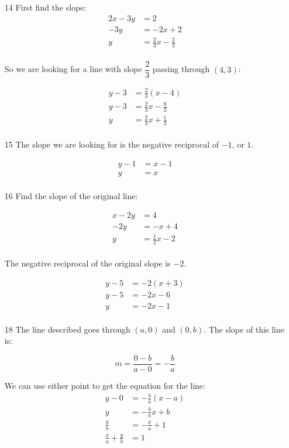 \documentclass[fleqn,addpoints]{exam}
\begin{document}
\begin{itemize}
\item[14]
First find the slope:
\begin{align*}
  2x - 3y &= 2 \\
  -3y &= -2x + 2 \\
  y &= \frac{2}{3}x - \frac{2}{3} \\
\end{align*}

So we are looking for a line with slope $\dfrac{2}{3}$ passing through $(4, 3)$:

\begin{align*}
  y - 3 &= \frac{2}{3}(x - 4) \\
  y - 3 &= \frac{2}{3}x - \frac{8}{3} \\
  y &= \frac{2}{3}x + \frac{1}{3} \\
\end{align*}

\item[15]
The slope we are looking for is the negative reciprocal of $-1$, or $1$.

\begin{align*}
  y - 1 &= x - 1 \\
  y  &= x \\
\end{align*}

\item[16]
Find the slope of the original line:

\begin{align*}
  x - 2y &= 4 \\
   -2y &= -x + 4 \\
   y &= \frac{1}{2}x - 2 \\
\end{align*}

The negative reciprocal of the original slope is $-2$.

\begin{align*}
  y - 5 &= -2(x+3) \\
  y - 5 &= -2x - 6 \\
  y  &= -2x - 1 \\
\end{align*}

\item[18]
The line described goes through $(a, 0)$ and $(0, b)$.  The slope of this line is:

\[
  m = \frac{0 - b}{a - 0} = - \frac{b}{a}
\]

We can use either point to get the equation for the line:
\begin{align*}
  y - 0 &= - \frac{b}{a} (x - a) \\
  y &= - \frac{b}{a}x + b \\
  \frac{y}{b} &= - \frac{x}{a} + 1 \\
  \frac{x}{a} + \frac{y}{b} &= 1 \\
\end{align*}


\end{itemize}
\end{document}
